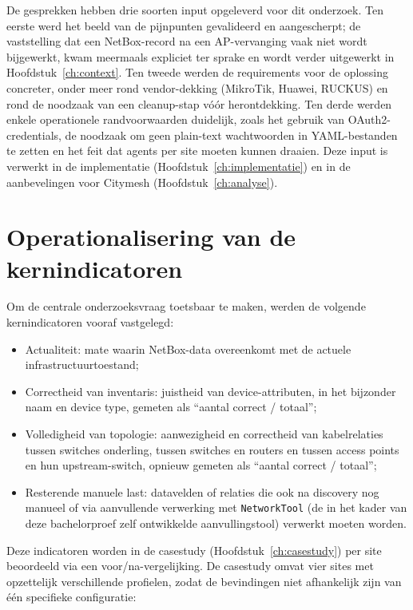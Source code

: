 De gesprekken hebben drie soorten input opgeleverd voor dit onderzoek. Ten eerste werd het beeld van de pijnpunten gevalideerd en aangescherpt; de vaststelling dat een NetBox-record na een AP-vervanging vaak niet wordt bijgewerkt, kwam meermaals expliciet ter sprake en wordt verder uitgewerkt in Hoofdstuk~\ref{ch:context}. Ten tweede werden de requirements voor de oplossing concreter, onder meer rond vendor-dekking (MikroTik, Huawei, RUCKUS) en rond de noodzaak van een cleanup-stap vóór herontdekking. Ten derde werden enkele operationele randvoorwaarden duidelijk, zoals het gebruik van OAuth2-credentials, de noodzaak om geen plain-text wachtwoorden in YAML-bestanden te zetten en het feit dat agents per site moeten kunnen draaien. Deze input is verwerkt in de implementatie (Hoofdstuk~\ref{ch:implementatie}) en in de aanbevelingen voor Citymesh (Hoofdstuk~\ref{ch:analyse}).

\section{Operationalisering van de kernindicatoren}
\label{sec:operationalisering}

Om de centrale onderzoeksvraag toetsbaar te maken, werden de volgende kernindicatoren vooraf vastgelegd:
\begin{itemize}
  \item Actualiteit: mate waarin NetBox-data overeenkomt met de actuele infrastructuurtoestand;
  \item Correctheid van inventaris: juistheid van device-attributen, in het bijzonder naam en device type, gemeten als ``aantal correct / totaal'';
  \item Volledigheid van topologie: aanwezigheid en correctheid van kabelrelaties tussen switches onderling, tussen switches en routers en tussen access points en hun upstream-switch, opnieuw gemeten als ``aantal correct / totaal'';
  \item Resterende manuele last: datavelden of relaties die ook na discovery nog manueel of via aanvullende verwerking met \texttt{NetworkTool} (de in het kader van deze bachelorproef zelf ontwikkelde aanvullingstool) verwerkt moeten worden.
\end{itemize}

Deze indicatoren worden in de casestudy (Hoofdstuk~\ref{ch:casestudy}) per site beoordeeld via een voor/na-vergelijking. De casestudy omvat vier sites met opzettelijk verschillende profielen, zodat de bevindingen niet afhankelijk zijn van \'e\'en specifieke configuratie:

